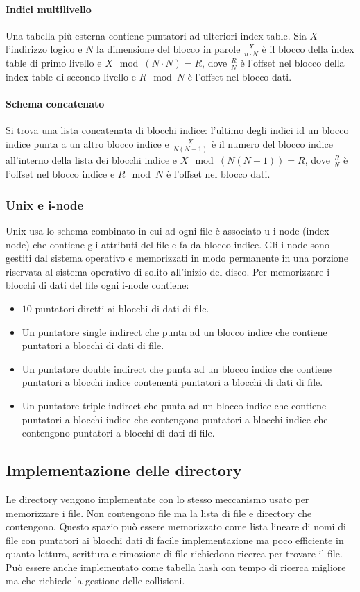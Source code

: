 \paragraph{Indici multilivello} Una tabella pi\`u esterna contiene puntatori ad ulteriori index table. Sia $X$ l'indirizzo logico e $N$ la dimensione del blocco in parole 
$\frac{X}{n\cdot N}$ \`e il blocco della index table di primo livello e $X\mod (N\cdot N) = R$, dove $\frac{R}{N}$ \`e l'offset nel blocco della index table di secondo livello e 
$R\mod N$ \`e l'offset nel blocco dati.
\paragraph{Schema concatenato} Si trova una lista concatenata di blocchi indice: l'ultimo degli indici id un blocco indice punta a un altro blocco indice e $\frac{X}{N(N-1)}$ \`e il 
numero del blocco indice all'interno della lista dei blocchi indice e $X\mod(N(N-1)) = R$, dove $\frac{R}{N}$ \`e l'offset nel blocco indice e $R\mod N$ \`e l'offset nel blocco dati. 
\subsubsection{Unix e i-node}
Unix usa lo schema combinato in cui ad ogni file \`e associato u i-node (index-node) che contiene gli attributi del file e fa da blocco indice. Gli i-node sono gestiti dal sistema 
operativo e memorizzati in modo permanente in una porzione riservata al sistema operativo di solito all'inizio del disco. Per memorizzare i blocchi di dati del file ogni i-node contiene:
\begin{itemize}
	\item $10$ puntatori diretti ai blocchi di dati di file.
	\item Un puntatore single indirect che punta ad un blocco indice che contiene puntatori a blocchi di dati di file.
	\item Un puntatore double indirect che punta ad un blocco indice che contiene puntatori a blocchi indice contenenti puntatori a blocchi di dati di file.
	\item Un puntatore triple indirect che punta ad un blocco indice che contiene puntatori a blocchi indice che contengono puntatori a blocchi indice che contengono puntatori a
		blocchi di dati di file. 
\end{itemize}
\subsection{Implementazione delle directory}
Le directory vengono implementate con lo stesso meccanismo usato per memorizzare i file. Non contengono file ma la lista di file e directory che contengono. Questo spazio pu\`o essere
memorizzato come lista lineare di nomi di file con puntatori ai blocchi dati di facile implementazione ma poco efficiente in quanto lettura, scrittura e rimozione di file richiedono 
ricerca per trovare il file. Pu\`o essere anche implementato come tabella hash con tempo di ricerca migliore ma che richiede la gestione delle collisioni. 
